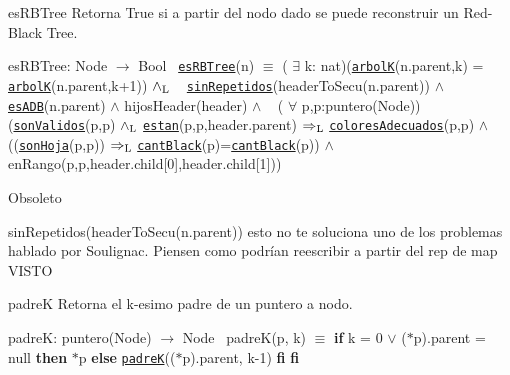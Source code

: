 \begin{DoxyParagraph}{es\+R\+B\+Tree}
Retorna True si a partir del nodo dado se puede reconstruir un Red-\/\+Black Tree.

es\+R\+B\+Tree\+: Node $\to$ Bool~\newline
 \href{axiomas.html#esRBTree}{\tt es\+R\+B\+Tree}(n) $\equiv$ ( $\exists$ k\+: nat)(\href{axiomas.html#arbolK}{\tt arbolK}(n.\+parent,k) = \href{axiomas.html#arbolK}{\tt arbolK}(n.\+parent,k+1)) $\land_{\rm L}$ ~\newline
 \href{axiomas.html#sinRepetidos}{\tt sin\+Repetidos}(header\+To\+Secu(n.\+parent)) $\land$ \href{axiomas.html#esADB}{\tt es\+A\+DB}(n.\+parent) $\land$ hijos\+Header(header) $\land$ ~\newline
 ( $\forall$ p,p\textquotesingle{}\+:puntero(\+Node))(\href{axiomas.html#sonValidos}{\tt son\+Validos}(p,p\textquotesingle{}) $\land_{\rm L}$ \href{axiomas.html#estan}{\tt estan}(p,p\textquotesingle{},header.\+parent) $\Rightarrow_{\rm L}$ \href{axiomas.html#coloresAdecuados}{\tt colores\+Adecuados}(p,p\textquotesingle{}) $\land$ ~\newline
 ((\href{axiomas.html#sonHoja}{\tt son\+Hoja}(p,p\textquotesingle{})) $\Rightarrow_{\rm L}$ \href{axiomas.html#cantBlack}{\tt cant\+Black}(p)=\href{axiomas.html#cantBlack}{\tt cant\+Black}(p\textquotesingle{})) $\land$ en\+Rango(p,p\textquotesingle{},header.\+child\mbox{[}0\mbox{]},header.\+child\mbox{[}1\mbox{]})) 
\end{DoxyParagraph}


\begin{DoxyRefDesc}{Obsoleto}
\item[\hyperlink{deprecated__deprecated000002}{Obsoleto}]sin\+Repetidos(header\+To\+Secu(n.\+parent)) esto no te soluciona uno de los problemas hablado por Soulignac. Piensen como podrían reescribir a partir del rep de map V\+I\+S\+TO\end{DoxyRefDesc}


\begin{DoxyParagraph}{padreK}
Retorna el k-\/esimo padre de un puntero a nodo.

padreK\+: puntero(\+Node) $\to$ Node~\newline
 padre\+K(p, k) $\equiv$ {\bfseries if} k = 0 $\lor$ ($\ast$p).parent = null {\bfseries then} $\ast$p {\bfseries else} \href{axiomas.html#padreK}{\tt padreK}(($\ast$p).parent, k-\/1) {\bfseries fi} {\bfseries fi} 
\end{DoxyParagraph}


